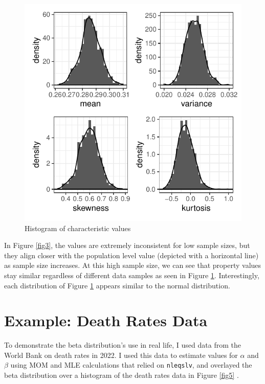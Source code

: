 \documentclass{article}\usepackage[]{graphicx}\usepackage[]{xcolor}
\begin{document}
\begin{multicols}{2}
\begin{figure}[H]
 \begin{center}
 \includegraphics[scale=0.7]{sampling_distrib.pdf}
 \caption{Histogram of characteristic values}
 \label{fig4}
 \end{center}
 \end{figure}

In Figure \ref{fig3}, the values are extremely inconsistent for low sample sizes, but they align closer with the population level value (depicted with a horizontal line) as sample size increases. At this high sample size, we can see that property values stay similar regardless of different data samples as seen in Figure \ref{fig4}. Interestingly, each distribution of Figure \ref{fig4} appears similar to the normal distribution.


\section{Example: Death Rates Data}
To demonstrate the beta distribution's use in real life, I used data from the World Bank on death rates in 2022. I used this data to estimate values for $\alpha$ and $\beta$ using MOM and MLE calculations that relied on \texttt{nleqslv}, and overlayed the beta distribution over a histogram of the death rates data in Figure \ref{fig5} \citep{nleqslv}.


\end{multicols}
\end{document}
